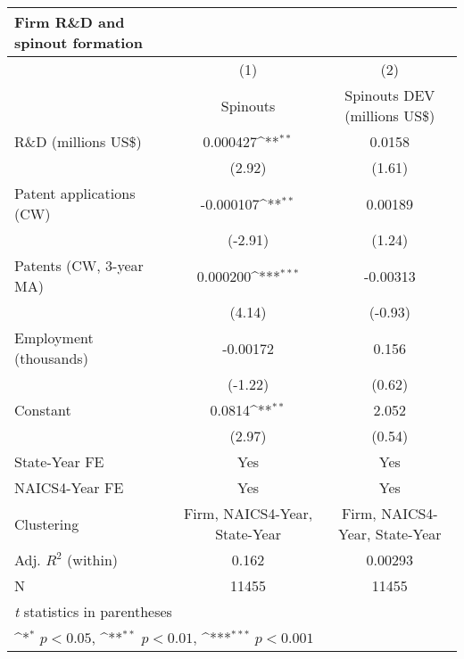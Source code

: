 {
\def\sym#1{\ifmmode^{#1}\else\(^{#1}\)\fi}
\begin{tabular}{l*{2}{c}}
Firm R\&D and spinout formation& \\
\hline\hline
            &\multicolumn{1}{c}{(1)}&\multicolumn{1}{c}{(2)}\\
            &\multicolumn{1}{c}{Spinouts}&\multicolumn{1}{c}{Spinouts DEV (millions US\$)}\\
\hline
R\&D (millions US\$)         &    0.000427\sym{**} &      0.0158         \\
            &      (2.92)         &      (1.61)         \\
Patent applications (CW)&   -0.000107\sym{**} &     0.00189         \\
            &     (-2.91)         &      (1.24)         \\
Patents (CW, 3-year MA)&    0.000200\sym{***}&    -0.00313         \\
            &      (4.14)         &     (-0.93)         \\
Employment (thousands)         &    -0.00172         &       0.156         \\
            &     (-1.22)         &      (0.62)         \\
Constant      &      0.0814\sym{**} &       2.052         \\
            &      (2.97)         &      (0.54)         \\
State-Year FE&         Yes         &         Yes         \\
NAICS4-Year FE&         Yes         &         Yes         \\
\hline
Clustering    &Firm, NAICS4-Year, State-Year         &Firm, NAICS4-Year, State-Year         \\
Adj. $R^2$ (within) &       0.162         &     0.00293         \\
N           &       11455         &       11455         \\
\hline\hline
\multicolumn{3}{l}{\footnotesize \textit{t} statistics in parentheses}\\
\multicolumn{3}{l}{\footnotesize \sym{*} \(p<0.05\), \sym{**} \(p<0.01\), \sym{***} \(p<0.001\)}\\
\end{tabular}
}
